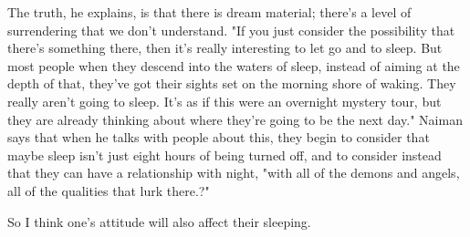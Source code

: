 \documentclass[a4paper]{rapport3}
\begin{document}
\begin{displayquote}
The truth, he explains, is that there is dream material; there's a level of surrendering that we don't understand. "If you just consider
the possibility that there's something there, then it's really interesting to let go and to sleep. But most people when they descend into the waters of sleep, instead of aiming at the depth of that, they've got their sights set on the morning shore of waking. They really aren't going to sleep. It's as if this were an overnight mystery tour, but they are already thinking about where they're going to be the next day."
Naiman says that when he talks with people about this, they begin to consider that maybe sleep isn't just eight hours of being turned off, and to consider instead that they can have a relationship with night, "with all of the demons and angels, all of the qualities that lurk there.?"
\end{displayquote}

So I think one's attitude will also affect their sleeping.
\end{document}
